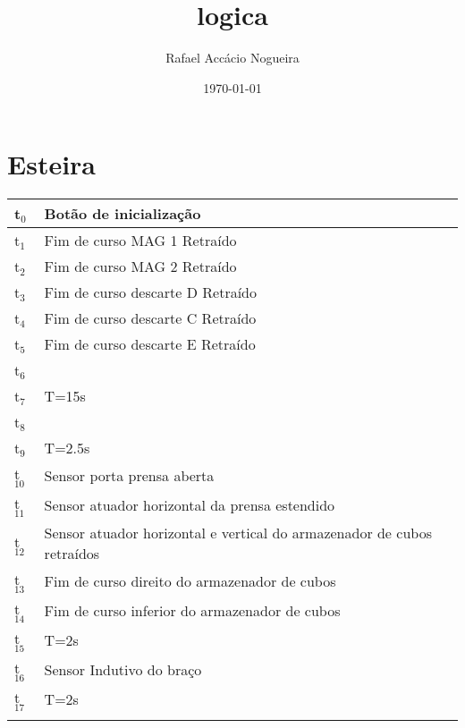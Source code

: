 \documentclass[11pt]{article}
\author{Rafael Accácio Nogueira}
\date{\today}
\title{logica}
\begin{document}
\maketitle
\tableofcontents

\newpage
\section{Esteira}
\label{sec-1}
\begin{center}
\begin{tabular}{ll}
t$_{\text{0}}$ & Botão de inicialização\\
\hline
t$_{\text{1}}$ & Fim de curso MAG 1 Retraído\\
t$_{\text{2}}$ & Fim de curso MAG 2 Retraído\\
t$_{\text{3}}$ & Fim de curso descarte D Retraído\\
t$_{\text{4}}$ & Fim de curso descarte C Retraído\\
t$_{\text{5}}$ & Fim de curso descarte E Retraído\\
t$_{\text{6}}$ & \\
t$_{\text{7}}$ & T=15s\\
t$_{\text{8}}$ & \\
t$_{\text{9}}$ & T=2.5s\\
t$_{\text{10}}$ & Sensor porta prensa aberta\\
t$_{\text{11}}$ & Sensor atuador horizontal da prensa estendido\\
t$_{\text{12}}$ & Sensor atuador horizontal e vertical do armazenador de cubos retraídos\\
t$_{\text{13}}$ & Fim de curso direito do armazenador de cubos\\
t$_{\text{14}}$ & Fim de curso inferior do armazenador de cubos\\
t$_{\text{15}}$ & T=2s\\
t$_{\text{16}}$ & Sensor Indutivo do braço\\
t$_{\text{17}}$ & T=2s\\
 & \\
\end{tabular}
\end{center}
\end{document}
